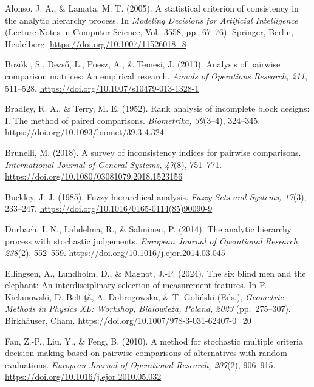 \documentclass[11pt]{amsart}
\theoremstyle{definition}
\theoremstyle{plain}
\numberwithin{equation}{section}
\begin{document}
\begin{thebibliography}{}

Alonso, J. A., \& Lamata, M. T. (2005).
A statistical criterion of consistency in the analytic hierarchy process.
In \textit{Modeling Decisions for Artificial Intelligence}
(Lecture Notes in Computer Science, Vol.~3558, pp.~67--76).
Springer, Berlin, Heidelberg.
\url{https://doi.org/10.1007/11526018_8}

Boz\'oki, S., Dezs\H{o}, L., Poesz, A., \& Temesi, J. (2013).
Analysis of pairwise comparison matrices: An empirical research.
\textit{Annals of Operations Research, 211}, 511--528.
\url{https://doi.org/10.1007/s10479-013-1328-1}

Bradley, R. A., \& Terry, M. E. (1952).
Rank analysis of incomplete block designs: I. The method of paired comparisons.
\textit{Biometrika, 39}(3--4), 324--345.
\url{https://doi.org/10.1093/biomet/39.3-4.324}

Brunelli, M. (2018).
A survey of inconsistency indices for pairwise comparisons.
\textit{International Journal of General Systems, 47}(8), 751--771.
\url{https://doi.org/10.1080/03081079.2018.1523156}

Buckley, J. J. (1985).
Fuzzy hierarchical analysis.
\textit{Fuzzy Sets and Systems, 17}(3), 233--247.
\url{https://doi.org/10.1016/0165-0114(85)90090-9}

Durbach, I. N., Lahdelma, R., \& Salminen, P. (2014).
The analytic hierarchy process with stochastic judgements.
\textit{European Journal of Operational Research, 238}(2), 552--559.
\url{https://doi.org/10.1016/j.ejor.2014.03.045}

Ellingsen, A., Lundholm, D., \& Magnot, J.-P. (2024).
The six blind men and the elephant: An interdisciplinary selection of measurement features.
In P. Kielanowski, D. Belti\c{t}\u{a}, A. Dobrogowska, \& T. Goli\'nski (Eds.),
\textit{Geometric Methods in Physics XL: Workshop, Bia{\l}owie\.{z}a, Poland, 2023}
(pp.~275--307). Birkh\"auser, Cham.
\url{https://doi.org/10.1007/978-3-031-62407-0_20}

Fan, Z.-P., Liu, Y., \& Feng, B. (2010).
A method for stochastic multiple criteria decision making based on pairwise comparisons of alternatives with random evaluations.
\textit{European Journal of Operational Research, 207}(2), 906--915.
\url{https://doi.org/10.1016/j.ejor.2010.05.032}


\end{thebibliography}
\end{document}
